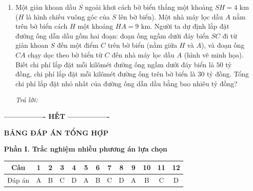 \documentclass[12pt,a4paper]{article}
\newcommand{\otraloi}{\par\nobreak\smallskip\noindent\textit{Trả lời:}\quad\fbox{\rule{0pt}{11pt}\makebox[0.3cm]{}}\,\fbox{\rule{0pt}{11pt}\makebox[0.3cm]{}}\,\fbox{\rule{0pt}{11pt}\makebox[0.3cm]{}}\,\fbox{\rule{0pt}{11pt}\makebox[0.3cm]{}}}
\begin{document}
\begin{enumerate}[start=3]
\item Một giàn khoan dầu $S$ ngoài khơi cách bờ biển thẳng một khoảng $SH=4\text{ km}$ ($H$ là hình chiếu vuông góc của $S$ lên bờ biển). Một nhà máy lọc dầu $A$ nằm trên bờ biển cách $H$ một khoảng $HA=9\text{ km}$. Người ta dự định lắp đặt đường ống dẫn dầu gồm hai đoạn: đoạn ống ngầm dưới đáy biển $SC$ đi từ giàn khoan $S$ đến một điểm $C$ trên bờ biển (nằm giữa $H$ và $A$), và đoạn ống $CA$ chạy dọc theo bờ biển từ $C$ đến nhà máy lọc dầu $A$ (hình vẽ minh họa). Biết chi phí lắp đặt mỗi kilômét đường ống ngầm dưới đáy biển là $50$ tỷ đồng, chi phí lắp đặt mỗi kilômét đường ống trên bờ biển là $30$ tỷ đồng. Tổng chi phí lắp đặt nhỏ nhất của đường ống dẫn dầu bằng bao nhiêu tỷ đồng?
\begin{center}
\par{}
\end{center}
\otraloi
\end{enumerate}
\begin{center}\textbf{---------------- HẾT ----------------}\end{center}

\newpage\pagestyle{answers}
\begin{center}\Large\textbf{BẢNG ĐÁP ÁN TỔNG HỢP}\end{center}
\textbf{Phần I. Trắc nghiệm nhiều phương án lựa chọn}
\begin{center}
\renewcommand{\arraystretch}{1.5}
\begin{tabular}{|c|*{12}{c|}}\hline
Câu & 1&2&3&4&5&6&7&8&9&10&11&12\\\hline
Đáp án & A & B & C & D & A & B & C & D & A & B & C & D \\\hline
\end{tabular}
\end{center}
\end{document}
